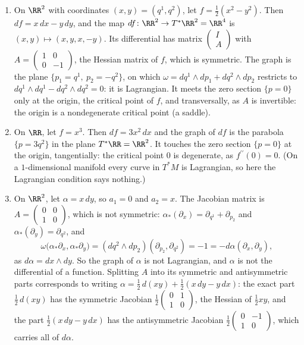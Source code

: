 \begin{example}\label{symplectic-geometry:example-derivative-section}
\begin{enumerate}
\item On $\RR^2$ with coordinates $(x, y) = (q^1, q^2)$, let $f = \frac12(x^2 - y^2)$. Then $df = x\,dx - y\,dy$, and the map $df \colon \RR^2 \to T^*\RR^2 = \RR^4$ is
$(x, y) \mapsto (x, y, x, -y)$. Its differential has matrix $\begin{pmatrix} I \\ A \end{pmatrix}$ with $A = \begin{pmatrix} 1 & 0 \\ 0 & -1 \end{pmatrix}$, the Hessian matrix of $f$, which is symmetric.
The graph is the plane $\{p_1 = q^1, \ p_2 = -q^2\}$, on which $\omega = dq^1 \wedge dp_1 + dq^2 \wedge dp_2$ restricts to $dq^1 \wedge dq^1 - dq^2 \wedge dq^2 = 0$: it is Lagrangian. It meets the
zero section $\{p = 0\}$ only at the origin, the critical point of $f$, and transversally, as $A$ is invertible: the origin is a nondegenerate critical point (a saddle).
\item On $\RR$, let $f = x^3$. Then $df = 3x^2\,dx$ and the graph of $df$ is the parabola $\{p = 3q^2\}$ in the plane $T^*\RR = \RR^2$. It touches the zero section $\{p = 0\}$ at the origin, tangentially:
the critical point $0$ is degenerate, as $f^{\prime\prime}(0) = 0$. (On a $1$-dimensional manifold every curve in $T^*M$ is Lagrangian, so here the Lagrangian condition says nothing.)
\item On $\RR^2$, let $\alpha = x\,dy$, so $a_1 = 0$ and $a_2 = x$. The Jacobian matrix is $A = \begin{pmatrix} 0 & 0 \\ 1 & 0 \end{pmatrix}$, which is not symmetric:
$\alpha_*(\partial_x) = \partial_{q^1} + \partial_{p_2}$ and $\alpha_*(\partial_y) = \partial_{q^2}$, and
\[
\omega\bigl(\alpha_*\partial_x, \alpha_*\partial_y\bigr) = (dq^2 \wedge dp_2)(\partial_{p_2}, \partial_{q^2}) = -1 = -d\alpha(\partial_x, \partial_y),
\]
as $d\alpha = dx \wedge dy$. So the graph of $\alpha$ is not Lagrangian, and $\alpha$ is not the differential of a function. Splitting $A$ into its symmetric and antisymmetric parts corresponds to writing
$\alpha = \frac12\,d(xy) + \frac12(x\,dy - y\,dx)$: the exact part $\frac12\,d(xy)$ has the symmetric Jacobian $\frac12\begin{pmatrix} 0 & 1 \\ 1 & 0 \end{pmatrix}$, the Hessian of $\frac12xy$, and the
part $\frac12(x\,dy - y\,dx)$ has the antisymmetric Jacobian $\frac12\begin{pmatrix} 0 & -1 \\ 1 & 0 \end{pmatrix}$, which carries all of $d\alpha$.
\end{enumerate}
\end{example}

